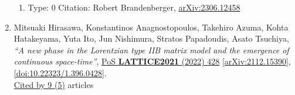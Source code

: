 \documentclass[a4paper,10pt]{article}
\begin{document}
\begin{enumerate}
\begin{enumerate}
  \item Type: 0 Citation: Robert Brandenberger, \href{https://arxiv.org/abs/2306.12458}{arXiv:2306.12458}
\end{enumerate}
\item Mitsuaki Hirasawa, Konstantinos Anagnostopoulos, Takehiro Azuma, Kohta Hatakeyama, Yuta Ito, Jun Nishimura, Stratos Papadoudis, Asato Tsuchiya, {\it ``A new phase in the Lorentzian type IIB matrix model and the emergence of continuous space-time''}, \href{https://www.doi.org/10.22323/1.396.0428}{PoS {\bf LATTICE2021} (2022) 428} \href{https://arxiv.org/abs/2112.15390}{[arXiv:2112.15390]}, \href{https://www.doi.org/10.22323/1.396.0428}{[doi:10.22323/1.396.0428]}.
\\\href{https://inspirehep.net/literature/?q=refersto%3Arecid%3A1998865}{Cited by 9 (5)} articles


\end{enumerate}
\end{document}
